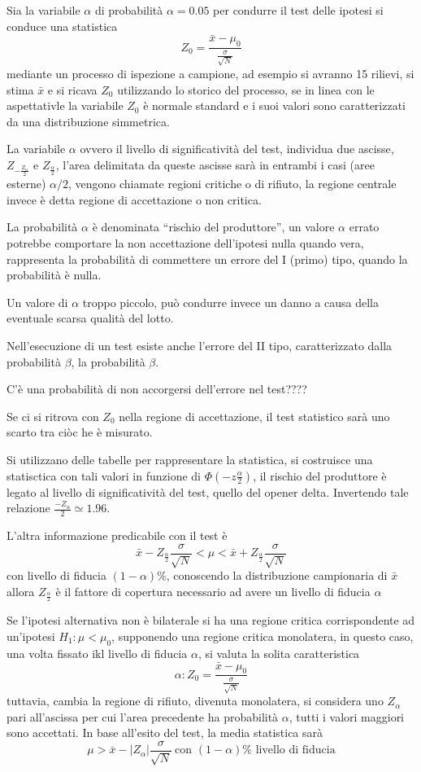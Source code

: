 Sia la variabile $\alpha$ di probabilità $\alpha = 0.05$ per condurre il test delle ipotesi si conduce una statistica
$$
Z_0 = \frac{\bar{x} - \mu_0}{\frac{\sigma}{\sqrt{N}}}
$$
mediante un processo di ispezione a campione, ad esempio si avranno 15 rilievi, si stima $\bar{x}$ e si ricava $Z_0$ utilizzando lo storico del processo, se in linea con le aspettativle la variabile $Z_0$ è normale standard e i suoi valori sono caratterizzati da una distribuzione simmetrica.

La variabile $\alpha$ ovvero il livello di significatività del test, 
individua due ascisse, $Z_{-\frac{Z_\alpha}{2}}$ e $Z_{\frac{\alpha}{2}}$, 
l'area delimitata da queste ascisse sarà in entrambi i casi (aree esterne) 
$\alpha/2$, vengono chiamate regioni critiche o di rifiuto, la regione centrale 
invece è detta regione di accettazione o non critica.

La probabilità $\alpha$ è denominata ``rischio del produttore'', un valore 
$\alpha$ errato potrebbe comportare la non accettazione dell'ipotesi nulla 
quando vera, rappresenta la probabilità di commettere un errore del I (primo) tipo, 
quando la probabilità è nulla. 

Un valore di $\alpha$ troppo piccolo, può condurre invece un danno a causa della eventuale scarsa qualità del lotto.

Nell'esecuzione di un test esiste anche l'errore del II tipo, caratterizzato dalla probabilità $\beta$, la probabilità $\beta$.

C'è una probabilità di non accorgersi dell'errore nel test????

Se ci si ritrova con $Z_0$ nella regione di accettazione, il test statistico sarà uno scarto tra ciòc he è misurato.

Si utilizzano delle tabelle per rappresentare la statistica, si costruisce una 
statisctica con tali valori in funzione di $\Phi(-z\frac{\alpha}{2})$, il 
rischio del produttore è legato al livello di significatività del test, quello 
del opener delta. Invertendo tale relazione $\frac{-Z_\alpha}{2}\simeq 1.96$.

L'altra informazione predicabile con il test è
$$
\bar{x} - Z_\frac{\alpha}{2}\frac{\sigma}{\sqrt{N}}<\mu < \bar{x} + Z_\frac{\alpha}{2}\frac{\sigma}{\sqrt{N}}
$$
con livello di fiducia $(1-\alpha)\%$, conoscendo la distribuzione campionaria di $\bar{x}$ allora $Z_\frac{\alpha}{2}$ è il fattore di copertura necessario ad avere un livello di fiducia $\alpha$

Se l'ipotesi alternativa non è bilaterale si ha una regione critica corrispondente ad un'ipotesi $H_1: \mu<\mu_0$, supponendo una regione critica monolatera, in questo caso, una volta fissato ikl livello di fiducia $\alpha$, si valuta la solita caratteristica 
$$
\alpha:Z_0=\frac{\bar{x} - \mu_0}{\frac{\sigma}{\sqrt{N}}}
$$
tuttavia, cambia la regione di rifiuto, divenuta monolatera, si considera uno $Z_\alpha$ pari all'ascissa per cui l'area precedente ha probabilità $\alpha$, tutti i valori maggiori sono accettati.
In base all'esito del test, la media statistica sarà
$$
\mu > \bar{x} - |Z_\alpha|\frac{\sigma}{\sqrt{N}}\ \text{con } (1-\alpha)\%\text{ livello di fiducia}
$$

